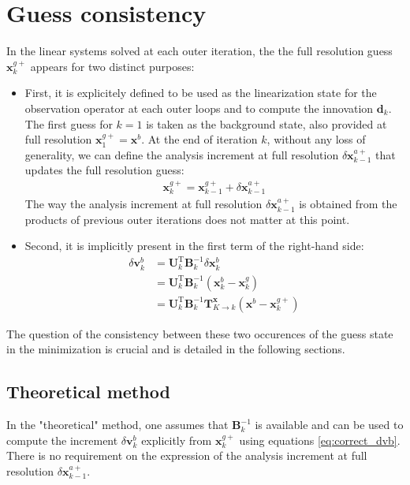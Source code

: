 \documentclass[npg, manuscript]{copernicus}
\begin{document}
\section{Guess consistency}
In the linear systems solved at each outer iteration, the the full resolution guess $\mathbf{x}^{g+}_k$ appears for two distinct purposes:
\begin{itemize}
\item First, it is explicitely defined to be used as the linearization state for the observation operator at each outer loops and to compute the innovation $\mathbf{d}_k$. The first guess for $k=1$ is taken as the background state, also provided at full resolution $\mathbf{x}^{g+}_1 = \mathbf{x}^b$. At the end of iteration $k$, without any loss of generality, we can define the analysis increment at full resolution $\delta \mathbf{x}^{a+}_{k-1}$ that updates the full resolution guess:
\begin{align}
\label{eq:usual_full_res_next}
\mathbf{x}^{g+}_k = \mathbf{x}^{g+}_{k-1} + \delta \mathbf{x}^{a+}_{k-1}
\end{align}
The way the analysis increment at full resolution $\delta \mathbf{x}^{a+}_{k-1}$ is obtained from the products of previous outer iterations does not matter at this point.

\item Second, it is implicitly present in the first term of the right-hand side:
\begin{align}
\label{eq:correct_dvb}
\delta \mathbf{v}^b_k & = \mathbf{U}_k^\mathrm{T} \mathbf{B}^{-1}_k \delta \mathbf{x}^b_k \nonumber \\
& = \mathbf{U}_k^\mathrm{T} \mathbf{B}^{-1}_k \left(\mathbf{x}^b_k - \mathbf{x}^g_k\right)  \nonumber \\
& = \mathbf{U}_k^\mathrm{T} \mathbf{B}^{-1}_k \mathbf{T}^\mathbf{x}_{K \rightarrow k} \left(\mathbf{x}^b - \mathbf{x}^{g+}_k\right)
\end{align}
\end{itemize}
The question of the consistency between these two occurences of the guess state in the minimization is crucial and is detailed in the following sections.

\subsection{Theoretical method}
In the "theoretical" method, one assumes that $\mathbf{B}_k^{-1}$ is available and can be used to compute the increment $\delta \mathbf{v}^b_k$ explicitly from $\mathbf{x}^{g+}_k$ using equations \eqref{eq:correct_dvb}. There is no requirement on the expression of the analysis increment at full resolution $\delta \mathbf{x}^{a+}_{k-1}$.
\end{document}
